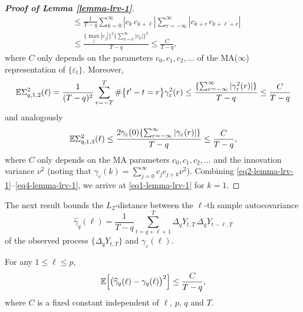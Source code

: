 \begin{proof}[\textnormal{\textbf{Proof of Lemma \ref{lemma-lrv-1}}}]
\begin{align}
 & \le \frac{1}{T-q} \sum_{k=0}^{\infty} | c_k \, c_{k+\ell} | \sum_{r=-\infty}^\infty | c_{k+r} \, c_{k+\ell+r} | \nonumber \\
 & \le \frac{\{ \max_j|c_j| \}^2 \{ \sum_{k=0}^{\infty} |c_k| \}^2}{T-q}  \le \frac{C}{T-q}, \label{eq2-lemma-lrv-1} 
\end{align}
where $C$ only depends on the parameters $c_0,c_1,c_2,\ldots$ of the MA($\infty$) representation of $\{ \varepsilon_t\}$. Moreover, 
\begin{equation}\label{eq3-lemma-lrv-1}
\mathbb{E} \Sigma_{q,1,2}^2(\ell) = \frac{1}{(T-q)^2} \sum_{r=-T}^T \# \big\{ t^\prime - t = r \big\} \gamma_{\varepsilon}^2(r) \le \frac{\{ \sum_{r=-\infty}^\infty |\gamma_{\varepsilon}^2(r)| \}}{T-q} \le \frac{C}{T-q} 
\end{equation}
and analogously
\begin{equation}\label{eq4-lemma-lrv-1}
\mathbb{E} \Sigma_{q,1,3}^2(\ell) \le \frac{2 \gamma_{\varepsilon}(0) \{ \sum_{r=-\infty}^{\infty} |\gamma_{\varepsilon}(r)| \}}{T-q} \le \frac{C}{T-q}, 
\end{equation}
where $C$ only depends on the MA parameters $c_0,c_1,c_2,\ldots$ and the innovation variance $\nu^2$ (noting that $\gamma_\varepsilon(k) = \sum_{j=0}^\infty c_j c_{j+k} \nu^2$). Combining \eqref{eq2-lemma-lrv-1}--\eqref{eq4-lemma-lrv-1}, we arrive at \eqref{eq1-lemma-lrv-1} for $k = 1$. 
\end{proof}


The next result bounds the $L_2$-distance between the $\ell$-th sample autocovariance 
\[ \widehat{\gamma}_q(\ell) = \frac{1}{T-q} \sum_{t=q+\ell+1}^T \Delta_q Y_{t,T} \, \Delta_q Y_{t-\ell,T} \]
of the observed process $\{ \Delta_q Y_{t,T} \}$ and $\gamma_{\varepsilon}(\ell)$. 
\begin{lemmaA}\label{lemma-lrv-2}
For any $1 \le \ell \le p$,   
\[ \mathbb{E} \Big[ \big( \widehat{\gamma}_q(\ell) - \gamma_q(\ell) \big)^2 \Big] \le \frac{C}{T-q}, \]
where $C$ is a fixed constant independent of $\ell$, $p$, $q$ and $T$. 
\end{lemmaA}


